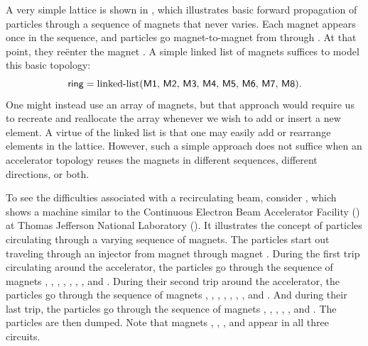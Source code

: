 %
{A very simple lattice} is shown in ,
which illustrates basic forward propagation of particles through a
sequence of magnets%
that never varies. Each magnet appears once in the sequence, and
particles go magnet-to-magnet from  through .
At that point, they re\"enter the magnet .
A simple linked list of magnets suffices to model this basic topology:
\begin{equation*}
  \text{\ptcelm{ring}} = \text{linked-list}(\text{%
    \ptcelm{M1}, \ptcelm{M2}, \ptcelm{M3}, \ptcelm{M4},
    \ptcelm{M5}, \ptcelm{M6}, \ptcelm{M7}, \ptcelm{M8}}).
\end{equation*}
One might instead use an array of magnets, but that approach
would require us to recreate and reallocate the array whenever
we wish to add or insert a new element. A virtue of the linked
list is that one may easily add or rearrange elements in the
lattice. However, such a simple approach does not suffice when
an accelerator topology reuses the magnets in different sequences,
different directions, or both.

%
{To see the difficulties associated with a recirculating beam},
consider , which shows a machine similar
to the Continuous Electron Beam Accelerator Facility
(\CEBAF) at Thomas Jefferson National Laboratory (\JLab). It
illustrates the concept of particles circulating through a varying
sequence of magnets. The particles start out traveling through an
injector from magnet  through magnet .
During the first trip circulating around the accelerator, the
particles go through the sequence of magnets ,
, , , , ,
, and . During their second trip around
the accelerator, the particles go through the sequence of magnets
, , , , ,
, , and . And during their
last trip, the particles go through the sequence of magnets
, , , , ,
and .  The particles are then dumped. Note that magnets
, , , and  appear in
all three circuits.

